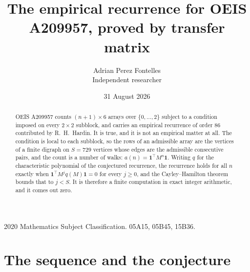 \documentclass[11pt,a4paper]{article}
\title{The empirical recurrence for OEIS A209957, proved by transfer matrix}
\author{Adrian Perez Fontelles\\ \small Independent researcher}
\date{31 August 2026}
\theoremstyle{plain}
\theoremstyle{definition}
\begin{document}
\maketitle

\begin{abstract}
OEIS A209957 counts $(n+1)\times6$ arrays over $\{0,\dots,2\}$ subject to a condition imposed on
every $2\times2$ subblock, and carries an empirical recurrence of order $86$ contributed
by R.~H.~Hardin. It is true, and it is not an empirical matter at all. The condition is local
to each subblock, so the rows of an admissible array are the vertices of a finite digraph
on $S=729$ vertices whose edges are the admissible consecutive pairs, and the count is a
number of walks: $a(n)=\mathbf{1}^{\!\top}M^{n}\mathbf{1}$. Writing $q$
for the characteristic polynomial of the conjectured recurrence, the recurrence holds for all
$n$ exactly when $\mathbf{1}^{\!\top}M^{j}q(M)\mathbf{1}=0$ for every $j\ge0$, and the
Cayley--Hamilton theorem bounds that to $j<S$. It is therefore a finite computation in exact
integer arithmetic, and it comes out zero.
\end{abstract}

\noindent\small 2020 Mathematics Subject Classification. 05A15, 05B45, 15B36.\normalsize

\section{The sequence and the conjecture}
\end{document}
